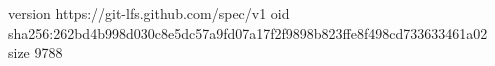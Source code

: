 version https://git-lfs.github.com/spec/v1
oid sha256:262bd4b998d030c8e5dc57a9fd07a17f2f9898b823ffe8f498cd733633461a02
size 9788
